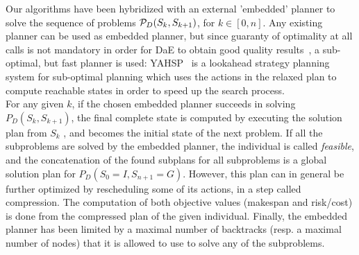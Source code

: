 \documentclass{llncs}
\begin{document}
Our algorithms have been hybridized with an external ’embedded’ planner to solve the sequence of problems ${\cal P}_D(S_{k},S_{k+1})$,  for $k \in [0,n]$. 
Any existing planner can be used as embedded planner, but since guaranty of optimality at all calls is not mandatory in order for DaE to obtain good quality results~\cite{Bibai2010}, a sub-optimal, but fast planner is used: YAHSP~\cite{Vidal2004} is a lookahead 
strategy planning system for sub-optimal planning which uses the  actions in the relaxed plan to compute reachable states in order to speed up the search process.\\ 
For any given $k$, if the chosen embedded planner succeeds in solving $ P_{D} (S_k, S_{k+1} )$, the final complete state is computed by executing the solution plan
from $S_k$ , and becomes the initial state of the next problem. If all the subproblems are solved by the  embedded planner, 
the individual is called \textit{ feasible}, and the concatenation of  the found  subplans for all subproblems  is a
global solution plan for $P_{D} (S_{0} = I, S_{n+1} = G)$. However, this plan can in general be further optimized by rescheduling some of its actions, in a step called
compression. The computation of both objective values (makespan and risk/cost) is done from the compressed plan of the given individual.
Finally, the embedded planner has been limited by a maximal number of backtracks (resp. a maximal number of nodes) that it is allowed to use to solve any of the subproblems.
\end{document}
